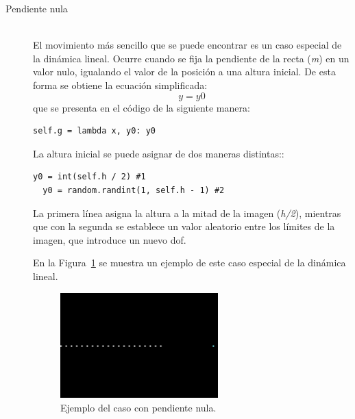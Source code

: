 \begin{description}
\item[Pendiente nula] \hfill 
\vspace{10pt}
\\
El movimiento más sencillo que se puede encontrar es un caso especial de la dinámica lineal. Ocurre cuando se fija la pendiente de la recta (\textit{m}) en un valor nulo, igualando el valor de la posición a una altura inicial. De esta forma se obtiene la ecuación simplificada:
$$y = y0$$
que se presenta en el código de la siguiente manera:
\vspace{10pt}
\begin{lstlisting}[frame=single]
  self.g = lambda x, y0: y0
\end{lstlisting}
La altura inicial se puede asignar de dos maneras distintas::
\vspace{10pt}
\begin{lstlisting}[frame=single]
  y0 = int(self.h / 2) #1
  y0 = random.randint(1, self.h - 1) #2
\end{lstlisting}
La primera línea asigna la altura a la mitad de la imagen (\textit{h/2}), mientras que con la segunda se establece un valor aleatorio entre los límites de la imagen, que introduce un nuevo \acrshort{dof}.

En la Figura~\ref{fig.urm} se muestra un ejemplo de este caso especial de la dinámica lineal.
\begin{figure}[H]
		\begin{center}
			\includegraphics[width=0.6\textwidth]{ figures/samples/URM_sample.png}
			\caption{Ejemplo del caso con pendiente nula.}
			\label{fig.urm}
		\end{center}
\end{figure}


\end{description}
